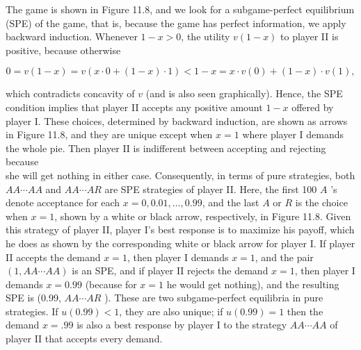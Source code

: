 \documentclass[12pt]{article}
\begin{document}
The game is shown in Figure 11.8, and we look for a subgame-perfect equilibrium (SPE) of the game, that is, because the game has perfect information, we apply backward induction. Whenever $1-x>0$, the utility $v(1-x)$ to player II is positive, because otherwise

$$
0=v(1-x)=v(x \cdot 0+(1-x) \cdot 1)<1-x=x \cdot v(0)+(1-x) \cdot v(1),
$$

which contradicts concavity of $v$ (and is also seen graphically). Hence, the SPE condition implies that player II accepts any positive amount $1-x$ offered by player I. These choices, determined by backward induction, are shown as arrows in Figure 11.8, and they are unique except when $x=1$ where player I demands the whole pie. Then player II is indifferent between accepting and rejecting because\\
she will get nothing in either case. Consequently, in terms of pure strategies, both $A A \cdots A A$ and $A A \cdots A R$ are SPE strategies of player II. Here, the first 100 $A$ 's denote acceptance for each $x=0,0.01, \ldots, 0.99$, and the last $A$ or $R$ is the choice when $x=1$, shown by a white or black arrow, respectively, in Figure 11.8. Given this strategy of player II, player I's best response is to maximize his payoff, which he does as shown by the corresponding white or black arrow for player I. If player II accepts the demand $x=1$, then player I demands $x=1$, and the pair $(1, A A \cdots A A)$ is an SPE, and if player II rejects the demand $x=1$, then player I demands $x=0.99$ (because for $x=1$ he would get nothing), and the resulting SPE is (0.99, $A A \cdots A R$ ). These are two subgame-perfect equilibria in pure strategies. If $u(0.99)<1$, they are also unique; if $u(0.99)=1$ then the demand $x=.99$ is also a best response by player I to the strategy $A A \cdots A A$ of player II that accepts every demand.
\end{document}
